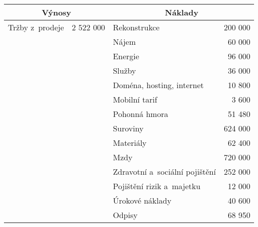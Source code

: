 \begin{table}[htbp]
\begin{center}
\begin{tabular}{lrlr}
\multicolumn{2}{c}{\textbf{Výnosy}\index{výnos}}                    & \multicolumn{2}{c}{\textbf{Náklady\index{náklad}}}                \\ \hline
Tržby z~prodeje        & \multicolumn{1}{r}{2 522 000} & Rekonstrukce                   & 200 000            \\
                       & \multicolumn{1}{r}{}          & Nájem                          & 60 000             \\
                       &                               & Energie                        & 96 000             \\
                       &                               & Služby                         & 36 000             \\
                       &                               & Doména, hosting, internet      & 10 800             \\
                       &                               & Mobilní tarif                  & 3 600              \\
                       &                               & Pohonná hmora                  & 51 480             \\
                       &                               & Suroviny                       & 624 000            \\
                       &                               & Materiály                      & 62 400             \\
                       &                               & Mzdy\index{mzda}                           & 720 000            \\
                       &                               & Zdravotní a~sociální pojištění & 252 000            \\
                       &                               & Pojištění rizik a~majetku      & 12 000             \\
                       &                               & Úrokové náklady\index{náklad}                & 40 600             \\
                       &                               & Odpisy\index{odpis}                         & 68 950             \\ \hline

\end{tabular}
\end{center}
\end{table}
